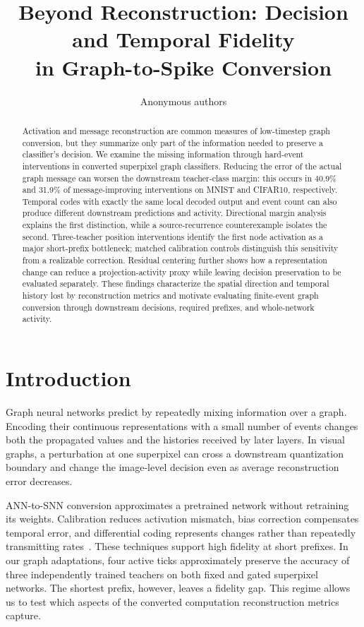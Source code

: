 \documentclass[10pt,twocolumn,letterpaper]{article}
\title{Beyond Reconstruction: Decision and Temporal Fidelity\\in Graph-to-Spike Conversion}
\author{Anonymous authors}
\begin{document}
\maketitle
\begin{abstract}
Activation and message reconstruction are common measures of low-timestep graph conversion, but they summarize only part of the information needed to preserve a classifier's decision. We examine the missing information through hard-event interventions in converted superpixel graph classifiers. Reducing the error of the actual graph message can worsen the downstream teacher-class margin: this occurs in 40.9\% and 31.9\% of message-improving interventions on MNIST and CIFAR10, respectively. Temporal codes with exactly the same local decoded output and event count can also produce different downstream predictions and activity. Directional margin analysis explains the first distinction, while a source-recurrence counterexample isolates the second. Three-teacher position interventions identify the first node activation as a major short-prefix bottleneck; matched calibration controls distinguish this sensitivity from a realizable correction. Residual centering further shows how a representation change can reduce a projection-activity proxy while leaving decision preservation to be evaluated separately. These findings characterize the spatial direction and temporal history lost by reconstruction metrics and motivate evaluating finite-event graph conversion through downstream decisions, required prefixes, and whole-network activity.
\end{abstract}

\section{Introduction}
Graph neural networks predict by repeatedly mixing information over a graph. Encoding their continuous representations with a small number of events changes both the propagated values and the histories received by later layers. In visual graphs, a perturbation at one superpixel can cross a downstream quantization boundary and change the image-level decision even as average reconstruction error decreases.

ANN-to-SNN conversion approximates a pretrained network without retraining its weights. Calibration reduces activation mismatch, bias correction compensates temporal error, and differential coding represents changes rather than repeatedly transmitting rates~\cite{li2021,wu2024ftbc,huang2025}. These techniques support high fidelity at short prefixes. In our graph adaptations, four active ticks approximately preserve the accuracy of three independently trained teachers on both fixed and gated superpixel networks. The shortest prefix, however, leaves a fidelity gap. This regime allows us to test which aspects of the converted computation reconstruction metrics capture.
\end{document}
